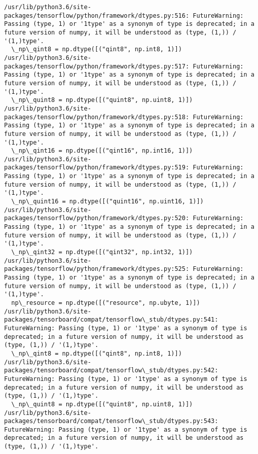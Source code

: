 \documentclass[11pt]{article}
\begin{document}
    \begin{Verbatim}[commandchars=\\\{\}]
/usr/lib/python3.6/site-packages/tensorflow/python/framework/dtypes.py:516: FutureWarning: Passing (type, 1) or '1type' as a synonym of type is deprecated; in a future version of numpy, it will be understood as (type, (1,)) / '(1,)type'.
  \_np\_qint8 = np.dtype([("qint8", np.int8, 1)])
/usr/lib/python3.6/site-packages/tensorflow/python/framework/dtypes.py:517: FutureWarning: Passing (type, 1) or '1type' as a synonym of type is deprecated; in a future version of numpy, it will be understood as (type, (1,)) / '(1,)type'.
  \_np\_quint8 = np.dtype([("quint8", np.uint8, 1)])
/usr/lib/python3.6/site-packages/tensorflow/python/framework/dtypes.py:518: FutureWarning: Passing (type, 1) or '1type' as a synonym of type is deprecated; in a future version of numpy, it will be understood as (type, (1,)) / '(1,)type'.
  \_np\_qint16 = np.dtype([("qint16", np.int16, 1)])
/usr/lib/python3.6/site-packages/tensorflow/python/framework/dtypes.py:519: FutureWarning: Passing (type, 1) or '1type' as a synonym of type is deprecated; in a future version of numpy, it will be understood as (type, (1,)) / '(1,)type'.
  \_np\_quint16 = np.dtype([("quint16", np.uint16, 1)])
/usr/lib/python3.6/site-packages/tensorflow/python/framework/dtypes.py:520: FutureWarning: Passing (type, 1) or '1type' as a synonym of type is deprecated; in a future version of numpy, it will be understood as (type, (1,)) / '(1,)type'.
  \_np\_qint32 = np.dtype([("qint32", np.int32, 1)])
/usr/lib/python3.6/site-packages/tensorflow/python/framework/dtypes.py:525: FutureWarning: Passing (type, 1) or '1type' as a synonym of type is deprecated; in a future version of numpy, it will be understood as (type, (1,)) / '(1,)type'.
  np\_resource = np.dtype([("resource", np.ubyte, 1)])
/usr/lib/python3.6/site-packages/tensorboard/compat/tensorflow\_stub/dtypes.py:541: FutureWarning: Passing (type, 1) or '1type' as a synonym of type is deprecated; in a future version of numpy, it will be understood as (type, (1,)) / '(1,)type'.
  \_np\_qint8 = np.dtype([("qint8", np.int8, 1)])
/usr/lib/python3.6/site-packages/tensorboard/compat/tensorflow\_stub/dtypes.py:542: FutureWarning: Passing (type, 1) or '1type' as a synonym of type is deprecated; in a future version of numpy, it will be understood as (type, (1,)) / '(1,)type'.
  \_np\_quint8 = np.dtype([("quint8", np.uint8, 1)])
/usr/lib/python3.6/site-packages/tensorboard/compat/tensorflow\_stub/dtypes.py:543: FutureWarning: Passing (type, 1) or '1type' as a synonym of type is deprecated; in a future version of numpy, it will be understood as (type, (1,)) / '(1,)type'.

\end{Verbatim}
\end{document}
